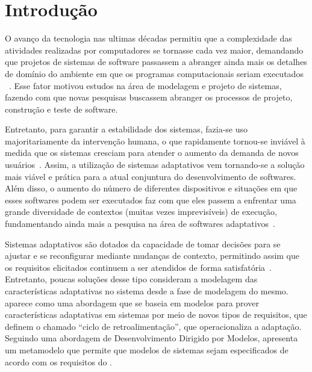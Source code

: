 
\chapter{Introdução}
\label{sec-intro}

O avanço da tecnologia nas ultimas décadas permitiu que a complexidade das atividades realizadas por computadores se tornasse cada vez maior, demandando que projetos de sistemas de software passassem a abranger ainda mais os detalhes de domínio do ambiente em que os programas computacionais seriam executados ~\cite{andersson2009modeling,brun2009engineering}. Esse fator motivou estudos na área de modelagem e projeto de sistemas, fazendo com que novas pesquisas buscassem abranger os processos de projeto, construção e teste de software. 

Entretanto, para garantir a estabilidade dos sistemas, fazia-se uso majoritariamente da intervenção humana, o que rapidamente tornou-se inviável à medida que os sistemas cresciam para atender o aumento da demanda de novos usuários~\cite{andersson2009modeling}. Assim, a utilização de sistemas adaptativos vem tornando-se a solução mais viável e prática para a atual conjuntura do desenvolvimento de softwares. Além disso, o aumento do número de diferentes dispositivos e situações em que esses softwares podem ser executados faz com que eles passem a enfrentar uma grande diversidade de contextos (muitas vezes imprevisíveis) de execução, fundamentando ainda mais a pesquisa na área de softwares adaptativos~\cite{kephart2003vision}.

Sistemas adaptativos são dotados da capacidade de tomar decisões para se ajustar e se reconfigurar mediante mudanças de contexto, permitindo assim que os requisitos elicitados continuem a ser atendidos de forma satisfatória~\cite{souza2012requirement}. Entretanto, poucas soluções desse tipo consideram a modelagem das características adaptativas no sistema desde a fase de modelagem do mesmo. \zanshin~\cite{tesevitor} aparece como uma abordagem que se baseia em modelos para prover características adaptativas em sistemas por meio de novos tipos de requisitos, que definem o chamado ``ciclo de retroalimentação'', que operacionaliza a adaptação. Seguindo uma abordagem de Desenvolvimento Dirigido por Modelos, \zanshin apresenta um metamodelo que permite que modelos de sistemas sejam especificados de acordo com os requisitos do \framework.

